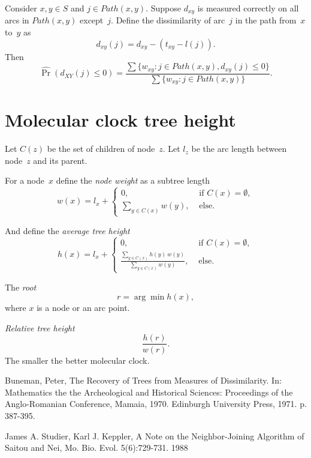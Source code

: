 \documentclass[10pt,a4paper]{article}
\theoremstyle{plain} \newtheorem{Lem}{Lemma}
\begin{document}
Consider $x, y \in S$ and $j \in Path(x,y)$.
Suppose $d_{xy}$ is measured correctly on all arcs in $Path(x,y)$ except~$j$.
Define the dissimilarity of arc~$j$ in the path from~$x$ to~$y$ as
$$ d_{xy}(j) = d_{xy} - (t_{xy} - l(j)). $$
Then
$$ \widehat \Pr (d_{XY}(j) \le 0) = \frac {\sum \{w_{xy}: j \in Path (x,y), d_{xy}(j) \le 0 \}} {\sum \{w_{xy}: j \in Path (x,y)\}}. $$


\section{Molecular clock tree height}

Let $C(z)$ be the set of children of node~$z$.
Let $l_z$ be the arc length between node~$z$ and its parent.

For a node~$x$ define 
the {\em node weight} as a subtree length
$$ w(x) =  l_x +
  \begin{cases}
    0, & \textrm { if } C(x) = \emptyset, \\
    \sum_{y \in C(x)} w(y), & \textrm { else}.
   \end{cases}
$$

And define the {\em average tree height} 
$$ h(x) = l_x +
  \begin{cases}
    0, & \textrm { if } C(x) = \emptyset, \\   
    \frac {\sum_{y \in C(x)} h(y) \ w(y)} {\sum_{y \in C(x)} w(y)}, & \textrm { else}.
   \end{cases}
$$

The {\em root}
$$r = \arg \min h(x),$$ 
where $x$ is a node or an arc point.

{\em Relative tree height}
$$ \frac {h(r)} {w(r)}. $$
The smaller the better molecular clock.



\begin{thebibliography}{9}
  Buneman, Peter,
  The Recovery of Trees from Measures of Dissimilarity. 
  In: Mathematics the the Archeological and Historical Sciences: Proceedings of the Anglo-Romanian Conference, 
  Mamaia, 1970. Edinburgh University Press, 1971. p. 387-395.

      James A. Studier, Karl J. Keppler, A Note on the Neighbor-Joining Algorithm of Saitou and Nei,
      Mo. Bio. Evol. 5(6):729-731. 1988
\end{thebibliography}



\end{document}
